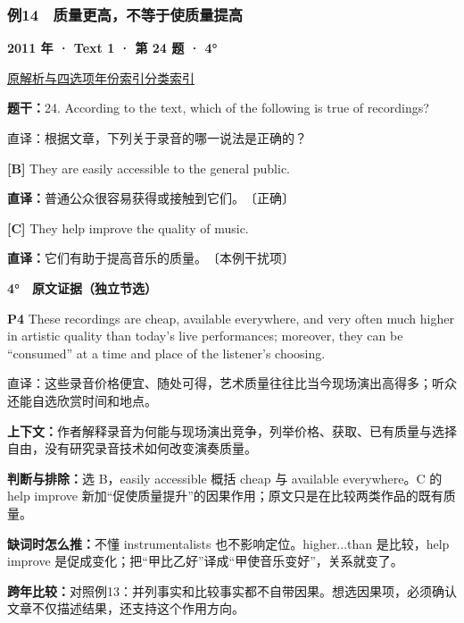 \documentclass[11pt,a4paper]{article}
\begin{document}
\subsubsection{例14　质量更高，不等于使质量提高}\label{case-2011-T1-Q24}
\noindent\textbf{2011 年 · Text 1 · 第 24 题 · 4°}\par\noindent \href{https://zj139.github.io/math-notes/english/9de80db7356ff635cec8a286/\#q24}{原解析与四选项}\quad \hyperref[idx-2011-T1-Q24]{年份索引}\quad \hyperref[class-R07]{分类索引}\par\smallskip
\noindent\textbf{题干：}24. According to the text, which of the following is true of recordings?\par
直译：根据文章，下列关于录音的哪一说法是正确的？\par
{}\noindent\textbf{[B]} They are easily accessible to the general public.\par\nopagebreak
\noindent\textbf{直译：}普通公众很容易获得或接触到它们。　〔正确〕\par
{}\noindent\textbf{[C]} They help improve the quality of music.\par\nopagebreak
\noindent\textbf{直译：}它们有助于提高音乐的质量。　〔本例干扰项〕\par
\begin{evidence}\textbf{4°　原文证据（独立节选）}\par
\textbf{P4} These recordings are cheap, available everywhere, and very often much higher in artistic quality than today's live performances; moreover, they can be “consumed” at a time and place of the listener's choosing.\par 直译：这些录音价格便宜、随处可得，艺术质量往往比当今现场演出高得多；听众还能自选欣赏时间和地点。\par
\end{evidence}
\noindent\textbf{上下文：}作者解释录音为何能与现场演出竞争，列举价格、获取、已有质量与选择自由，没有研究录音技术如何改变演奏质量。\par
\noindent\textbf{判断与排除：}选 B，easily accessible 概括 cheap 与 available everywhere。C 的 help improve 新加“促使质量提升”的因果作用；原文只是在比较两类作品的既有质量。\par
\noindent\textbf{缺词时怎么推：}不懂 instrumentalists 也不影响定位。higher...than 是比较，help improve 是促成变化；把“甲比乙好”译成“甲使音乐变好”，关系就变了。\par
\noindent\textbf{跨年比较：}对照例13：并列事实和比较事实都不自带因果。想选因果项，必须确认文章不仅描述结果，还支持这个作用方向。\par
\clearpage
\end{document}
